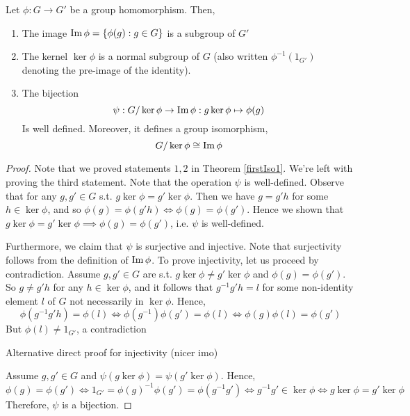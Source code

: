 \begin{theorem} 
  Let $\phi:G\to G'$ be a group homomorphism. Then,
  \begin{enumerate}
    \item The image $\operatorname{Im}\phi=\left\{ \phi(g) : g\in G \right\}$ is a subgroup of $G'$
    \item The kernel $\ker\phi$ is a normal subgroup of $G$ (also written
        $\phi^{-1}(1_{G'})$ denoting the pre-image of the identity).
    \item The bijection 
      \[\psi: G/\ker\phi\to\operatorname{Im}\phi : g \ker\phi\mapsto \phi(g)\]
      Is well defined. Moreover, it defines a group isomorphism,
      \[G/\ker\phi \cong \operatorname{Im}\phi\]
  \end{enumerate}
  \label{firstIso}
\end{theorem}
\begin{proof}
  Note that we proved statements $1,2$ in Theorem \ref{firstIso1}. We're left with proving
  the third statement. Note that the operation $\psi$ is well-defined. Observe that for
  any $g,g'\in G$ s.t. $g\ker\phi=g'\ker\phi$. Then we have $g=g'h$ for some
  $h\in\ker\phi$, and so $\phi(g)=\phi(g'h) \iff \phi(g)=\phi(g')$. Hence we shown that
  $g\ker\phi=g'\ker\phi \implies \phi(g)=\phi(g')$, i.e. $\psi$ is well-defined.

  Furthermore, we claim that $\psi$ is surjective and injective. Note that surjectivity
  follows from the definition of $\operatorname{Im}\phi$. To prove injectivity, let us proceed by
  contradiction. Assume $g,g'\in G$ are s.t. $g\ker\phi\neq g'\ker\phi$ and
  $\phi(g)=\phi(g')$. So $g\neq g'h$ for any $h\in\ker\phi$, and it follows that
  $g^{-1}g'h=l$ for some non-identity element $l$ of $G$ not necessarily in $\ker\phi$. Hence,
  \[\phi(g^{-1}g'h) = \phi(l) \iff \phi(g^{-1})\phi(g') = \phi(l) \iff
  \phi(g)\phi(l)=\phi(g')\]
  But $\phi(l)\neq 1_{G'}$, a contradiction

  Alternative direct proof for injectivity (nicer imo)
  
  Assume $g,g'\in G$ and $\psi(g\ker\phi) = \psi(g'\ker\phi)$. Hence,
  \[\phi(g) = \phi(g') \iff 1_{G'} = \phi(g)^{-1}\phi(g') = \phi(g^{-1}g') \iff g^{-1}g' \in \ker\phi \iff g\ker\phi = g'\ker\phi\]
  Therefore, $\psi$ is a bijection.
\end{proof}

